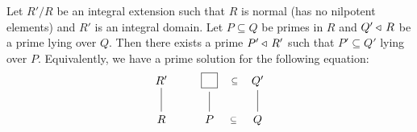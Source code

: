 \documentclass[11pt,a4paper]{article}
\begin{document}
\begin{theorem}
  Let $R'/R$ be an integral extension such that $R$ is normal (has no nilpotent
  elements) and $R'$ is an integral domain.
  Let $P \subseteq Q$ be primes in $R$ and $Q' \triangleleft\, R$ be a prime
  lying over $Q$.
  Then there exists a prime $P' \triangleleft\, R'$ such that $P' \subseteq Q'$
  lying over $P$.
  Equivalently, we have a prime solution for the following equation:
  \[\begin{tikzcd}[ampersand replacement=\&,cramped]
    {R'} \& {\boxed{\phantom{P}}} \& {Q'} \\
	R \& P \& Q
	\arrow["\subseteq", shift right=2.2, draw=none, from=1-2, to=1-3]
	\arrow[no head, from=2-1, to=1-1]
	\arrow[no head, from=2-2, to=1-2]
	\arrow["\subseteq", shift right=2.2, draw=none, from=2-2, to=2-3]
	\arrow[no head, from=2-3, to=1-3]
\end{tikzcd}\]
\end{theorem}
\end{document}
